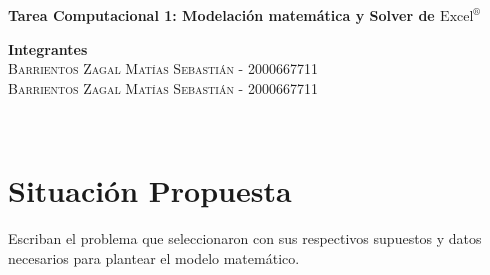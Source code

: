 \documentclass[11pt,addpoints]{article}
\begin{document}
\begin{center}

{\Large \bfseries Tarea Computacional 1: Modelación matemática y Solver de $\text{Excel}^\circledR$}\\[0.5cm]	%
\begin{minipage}{1.0\textwidth} 
\begin{center}	
\textbf{Integrantes}\\%
\textsc{Barrientos Zagal Matías Sebastián - 2000667711\\
Barrientos Zagal Matías Sebastián - 2000667711
\\[0.4cm]
}

\end{center}

\end{minipage}\\[0.2cm]
\end{center}

\section{Situación Propuesta}
Escriban el problema que seleccionaron con sus respectivos supuestos y datos necesarios para plantear el modelo matemático.
\end{document}

